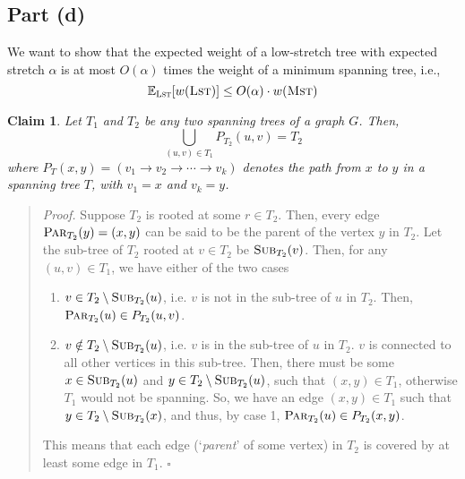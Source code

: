 \documentclass[9pt]{article}
\newtheorem{claim}{Claim}
\begin{document}
\subsection*{Part (d)}
We want to show that the expected weight of a low-stretch tree with expected stretch $\alpha$
is at most $O(\alpha)$ times the weight of a minimum spanning tree, i.e.,
\begin{equation}
    \mathbb{E}_{\textsc{Lst}}[w(\textsc{Lst})] \leq O(\alpha) \cdot w(\textsc{Mst})
\end{equation}
\begin{claim}
    \label{claim:tree-equality}
    Let $T_{1}$ and $T_{2}$ be any two spanning trees of a graph $G$. Then,
    \begin{equation}
        \bigcup_{(u, v) \in T_{1}} P_{T_{2}}(u, v) = T_{2}
    \end{equation}
    where $P_{T}(x, y) = (v_{1} \to v_{2} \to \cdots \to v_{k})$ denotes the path from $x$ to
    $y$ in a spanning tree $T$, with $v_{1} = x$ and $v_{k} = y$.
\end{claim}
\begin{quote}
\textit{Proof.}
    Suppose $T_{2}$ is rooted at some $r \in T_{2}$. Then, every edge
    $\textsc{Par}_{T_{2}}(y) = (x, y)$ can be said to be the parent of the vertex $y$ in
    $T_{2}$. Let the sub-tree of $T_{2}$ rooted at $v \in T_{2}$ be $\textsc{Sub}_{T_{2}}(v)$.
    Then, for any $(u, v) \in T_{1}$, we have either of the two cases
    \begin{enumerate}
        \item $v \in T_{2} \setminus \textsc{Sub}_{T_{2}}(u)$, i.e. $v$ is not in the sub-tree
        of $u$ in $T_{2}$. Then, $\textsc{Par}_{T_{2}}(u) \in P_{T_{2}}(u, v)$.
        \item $v \notin T_{2} \setminus \textsc{Sub}_{T_{2}}(u)$, i.e. $v$ is in the sub-tree
        of $u$ in $T_{2}$. $v$ is connected to all other vertices in this sub-tree. Then, there
        must be some $x \in \textsc{Sub}_{T_{2}}(u)$ and
        $y \in T_{2} \setminus \textsc{Sub}_{T_{2}}(u)$, such that $(x, y) \in T_{1}$, otherwise
        $T_{1}$ would not be spanning. So, we have an edge $(x, y) \in T_{1}$ such that
        $y \in T_{2} \setminus \textsc{Sub}_{T_{2}}(x)$, and thus, by case 1,
        $\textsc{Par}_{T_{2}}(u) \in P_{T_{2}}(x, y)$.
    \end{enumerate}
This means that each edge (`\textit{parent}' of some vertex) in $T_{2}$ is covered by at least
some edge in $T_{1}$.
\hfill $\square$
\end{quote}
\end{document}
